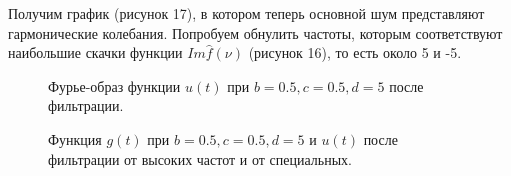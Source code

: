 \documentclass[a5paper, 10pt]{article}
\theoremstyle{definition}
\theoremstyle{plain}
\theoremstyle{remark}
\begin{document}
Получим график (рисунок 17), в котором теперь основной шум представляют гармонические колебания. Попробуем обнулить частоты, которым соответствуют наибольшие скачки функции $Im \hat{f}(\nu)$ (рисунок 16), то есть около 5 и -5.

\begin{figure}[h!]
\caption{Фурье-образ функции $u(t)$ при $b = 0.5, c = 0.5, d = 5$ после фильтрации.}
\end{figure}



\begin{figure}[h!]
\caption{Функция $g(t)$ при $b = 0.5, c = 0.5, d = 5$  и $u(t)$ после фильтрации от высоких частот и от специальных.}
\end{figure}
\end{document}
